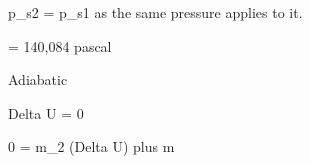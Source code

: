 p_s2 = p_s1 as the same pressure applies to it.

= 140,084 pascal

Adiabatic

Delta U = 0

0 = m_2 (Delta U) plus m